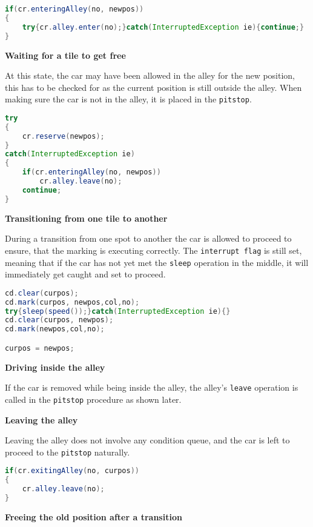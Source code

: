 \begin{lstlisting}[language=java]
if(cr.enteringAlley(no, newpos))
{
    try{cr.alley.enter(no);}catch(InterruptedException ie){continue;}
}
\end{lstlisting}

\textbf{Waiting for a tile to get free}

At this state, the car may have been allowed in the alley for the new position, this has to be checked for as the current position is still outside the alley. When making sure the car is not in the alley, it is placed in the \texttt{pitstop}.

\begin{lstlisting}[language=java]
try
{
    cr.reserve(newpos);
}
catch(InterruptedException ie)
{ 
    if(cr.enteringAlley(no, newpos))
        cr.alley.leave(no);
    continue;
}
\end{lstlisting}

\textbf{Transitioning from one tile to another}

During a transition from one spot to another the car is allowed to proceed to ensure, that the marking is executing correctly. The \texttt{interrupt flag} is still set, meaning that if the car has not yet met the \texttt{sleep} operation in the middle, it will immediately get caught and set to proceed.

\begin{lstlisting}[language=java]
cd.clear(curpos);
cd.mark(curpos, newpos,col,no);
try{sleep(speed());}catch(InterruptedException ie){}
cd.clear(curpos, newpos);
cd.mark(newpos,col,no);

curpos = newpos;
\end{lstlisting}

\textbf{Driving inside the alley}

If the car is removed while being inside the alley, the alley's \texttt{leave} operation is called in the \texttt{pitstop} procedure as shown later.

\textbf{Leaving the alley}

Leaving the alley does not involve any condition queue, and the car is left to proceed to the \texttt{pitstop} naturally.

\begin{lstlisting}[language=java]
if(cr.exitingAlley(no, curpos))
{
    cr.alley.leave(no);
}
\end{lstlisting}

\textbf{Freeing the old position after a transition}

